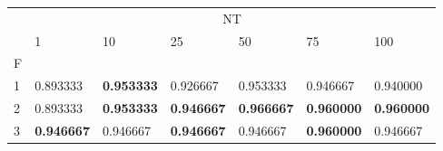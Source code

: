\begin{table}[htbp]
\centering
\label{iris-results}
\begin{tabular}{lllllll}
\toprule
 & \multicolumn{6}{c}{NT} \\
 & 1 & 10 & 25 & 50 & 75 & 100 \\
F &  &  &  &  &  &  \\
\midrule
1 & 0.893333 & \textbf{0.953333} & 0.926667 & 0.953333 & 0.946667 & 0.940000 \\
2 & 0.893333 & \textbf{0.953333} & \textbf{0.946667} & \textbf{0.966667} & \textbf{0.960000} & \textbf{0.960000} \\
3 & \textbf{0.946667} & 0.946667 & \textbf{0.946667} & 0.946667 & \textbf{0.960000} & 0.946667 \\
\bottomrule
\end{tabular}
\end{table}

